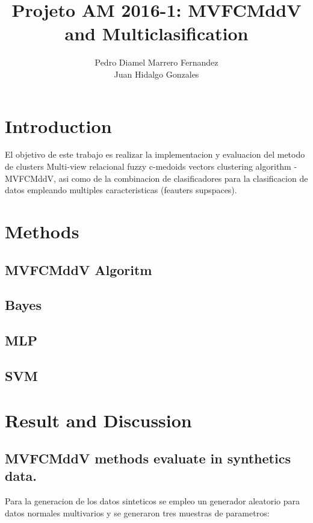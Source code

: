 \documentclass[12pt]{article}
\author{Pedro Diamel Marrero Fernandez \\ Juan Hidalgo Gonzales}
\title{Projeto AM 2016-1: MVFCMddV and Multiclasification}
\begin{document}
\maketitle



\section*{Introduction}

El objetivo de este trabajo es realizar la implementacion y evaluacion del metodo de clusters Multi-view relacional fuzzy c-medoids vectors clustering algorithm - MVFCMddV, asi como de la combinacion de clasificadores para la clasificacion de datos empleando multiples caracteristicas (feauters supspaces).  

\section{Methods}

\subsection{MVFCMddV Algoritm}

\subsection{Bayes}

\subsection{MLP}

\subsection{SVM}



\section{Result and Discussion }


\subsection{MVFCMddV methods evaluate in synthetics data.}

Para la generacion de los datos sinteticos se empleo un generador aleatorio para datos normales multivarios y se generaron tres muestras de parametros: 
\end{document}
